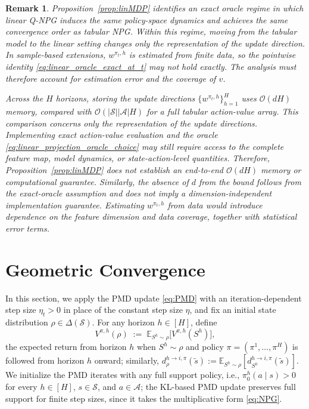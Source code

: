 \documentclass[11pt]{article}
\newtheorem{rem}{Remark}
\begin{document}
\begin{rem}\label{rem:linMDP}
Proposition~\ref{prop:linMDP} identifies an exact oracle regime in which
linear Q-NPG induces the same policy-space dynamics and achieves the same
convergence order as tabular NPG. Within this regime, moving from the
tabular model to the linear setting changes only the representation of the
update direction. In sample-based extensions, $w^{\pi_t,h}$ is estimated from finite data, so
the pointwise identity \eqref{eq:linear_oracle_exact_at_t} may not hold
exactly. The analysis must therefore account for estimation error and the
coverage of $v$.

Across the $H$ horizons, storing the update directions
$\{w^{\pi_t,h}\}_{h=1}^H$ uses $\mathcal{O}(dH)$ memory, compared with
$\mathcal{O}(|\mathcal S||\mathcal A|H)$ for a full tabular action-value array.
This comparison concerns only the representation of the update directions.
Implementing exact action-value evaluation and the oracle
\eqref{eq:linear_projection_oracle_choice} may still require access to the
complete feature map, model dynamics, or state-action-level quantities.
Therefore, Proposition~\ref{prop:linMDP} does not establish an end-to-end
$\mathcal{O}(dH)$ memory or computational guarantee. Similarly, the absence of
$d$ from the bound follows from the exact-oracle assumption and does not imply
a dimension-independent implementation guarantee. Estimating $w^{\pi_t,h}$
from data would introduce dependence on the feature dimension and data
coverage, together with statistical error terms.
\end{rem}

\section{Geometric Convergence}\label{sec:linear_convergence}
In this section, we apply the PMD update \eqref{eq:PMD} with an
iteration-dependent step size $\eta_t>0$ in place of the constant step size
$\eta$, and fix an initial state distribution $\rho\in\Delta(\mathcal S)$.
For any horizon $h\in[H]$, define
\[
V^{\pi,h}(\rho) \;:=\; \mathbb E_{S^h\sim \rho}\!\big[V^{\pi,h}(S^h)\big],
\]
the expected return from horizon $h$ when $S^h\sim\rho$ and policy
$\pi=(\pi^1,\dots,\pi^H)$ is followed from horizon $h$ onward; similarly,
$d^{h\to i,\pi}_\rho(\tilde s):=\mathbb{E}_{S^h\sim\rho}[d^{h\to i,\pi}_{S^h}(\tilde s)]$.
We initialize the PMD iterates with any full support policy, i.e.,
$\pi_0^h(a\mid s)>0$ for every $h\in[H]$, $s\in\mathcal S$, and
$a\in\mathcal A$; the KL-based PMD update preserves full support for finite
step sizes, since it takes the multiplicative form \eqref{eq:NPG}.
\end{document}
